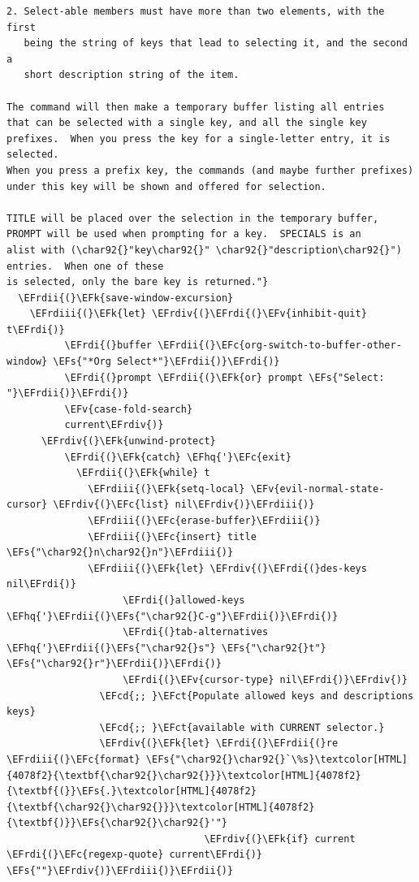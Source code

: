 \documentclass{scrartcl}
\newcommand{\EFk}[1]{\textcolor{EFk}{#1}} %
\newcommand{\EFs}[1]{\textcolor{EFs}{#1}} %
\newcommand{\EFct}[1]{\textcolor{EFct}{#1}} %
\newcommand{\EFc}[1]{\textcolor{EFc}{#1}} %
\newcommand{\EFv}[1]{\textcolor{EFv}{#1}} %
\newcommand{\EFcd}[1]{\textcolor{EFcd}{#1}} %
\newcommand{\EFhq}[1]{\textcolor{EFhq}{#1}} %
\newcommand{\EFrdi}[1]{\textcolor{EFrdi}{#1}} %
\newcommand{\EFrdii}[1]{\textcolor{EFrdii}{#1}} %
\newcommand{\EFrdiii}[1]{\textcolor{EFrdiii}{#1}} %
\newcommand{\EFrdiv}[1]{\textcolor{EFrdiv}{#1}} %
\begin{document}
\begin{Code}
\begin{Verbatim}[]
2. Select-able members must have more than two elements, with the first
   being the string of keys that lead to selecting it, and the second a
   short description string of the item.

The command will then make a temporary buffer listing all entries
that can be selected with a single key, and all the single key
prefixes.  When you press the key for a single-letter entry, it is selected.
When you press a prefix key, the commands (and maybe further prefixes)
under this key will be shown and offered for selection.

TITLE will be placed over the selection in the temporary buffer,
PROMPT will be used when prompting for a key.  SPECIALS is an
alist with (\char92{}"key\char92{}" \char92{}"description\char92{}") entries.  When one of these
is selected, only the bare key is returned."}
  \EFrdii{(}\EFk{save-window-excursion}
    \EFrdiii{(}\EFk{let} \EFrdiv{(}\EFrdi{(}\EFv{inhibit-quit} t\EFrdi{)}
          \EFrdi{(}buffer \EFrdii{(}\EFc{org-switch-to-buffer-other-window} \EFs{"*Org Select*"}\EFrdii{)}\EFrdi{)}
          \EFrdi{(}prompt \EFrdii{(}\EFk{or} prompt \EFs{"Select: "}\EFrdii{)}\EFrdi{)}
          \EFv{case-fold-search}
          current\EFrdiv{)}
      \EFrdiv{(}\EFk{unwind-protect}
          \EFrdi{(}\EFk{catch} \EFhq{'}\EFc{exit}
            \EFrdii{(}\EFk{while} t
              \EFrdiii{(}\EFk{setq-local} \EFv{evil-normal-state-cursor} \EFrdiv{(}\EFc{list} nil\EFrdiv{)}\EFrdiii{)}
              \EFrdiii{(}\EFc{erase-buffer}\EFrdiii{)}
              \EFrdiii{(}\EFc{insert} title \EFs{"\char92{}n\char92{}n"}\EFrdiii{)}
              \EFrdiii{(}\EFk{let} \EFrdiv{(}\EFrdi{(}des-keys nil\EFrdi{)}
                    \EFrdi{(}allowed-keys \EFhq{'}\EFrdii{(}\EFs{"\char92{}C-g"}\EFrdii{)}\EFrdi{)}
                    \EFrdi{(}tab-alternatives \EFhq{'}\EFrdii{(}\EFs{"\char92{}s"} \EFs{"\char92{}t"} \EFs{"\char92{}r"}\EFrdii{)}\EFrdi{)}
                    \EFrdi{(}\EFv{cursor-type} nil\EFrdi{)}\EFrdiv{)}
                \EFcd{;; }\EFct{Populate allowed keys and descriptions keys}
                \EFcd{;; }\EFct{available with CURRENT selector.}
                \EFrdiv{(}\EFk{let} \EFrdi{(}\EFrdii{(}re \EFrdiii{(}\EFc{format} \EFs{"\char92{}\char92{}`\%s}\textcolor[HTML]{4078f2}{\textbf{\char92{}\char92{}}}\textcolor[HTML]{4078f2}{\textbf{(}}\EFs{.}\textcolor[HTML]{4078f2}{\textbf{\char92{}\char92{}}}\textcolor[HTML]{4078f2}{\textbf{)}}\EFs{\char92{}\char92{}'"}
                                  \EFrdiv{(}\EFk{if} current \EFrdi{(}\EFc{regexp-quote} current\EFrdi{)} \EFs{""}\EFrdiv{)}\EFrdiii{)}\EFrdii{)}

\end{Verbatim}
\end{Code}
\end{document}
